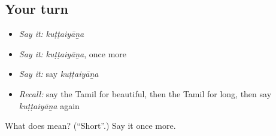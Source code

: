 \subsection*{Your turn}
\begin{itemize}
\raggedright
  \item \emph{Say it:} \emph{kuṭṭaiyāṉa}
  \item \emph{Say it:} \emph{kuṭṭaiyāṉa}, once more
  \item \emph{Say it:} say \emph{kuṭṭaiyāṉa}
  \item \emph{Recall:} say the Tamil for beautiful, then the Tamil for long, then say \emph{kuṭṭaiyāṉa} again
\end{itemize}

\begin{tcolorbox}[breakable,colback=teal!4,colframe=teal!35!black,title={Before you move on}]
What does  mean? (\textquotedblleft{}Short\textquotedblright{}.) Say it once more.
\end{tcolorbox}
